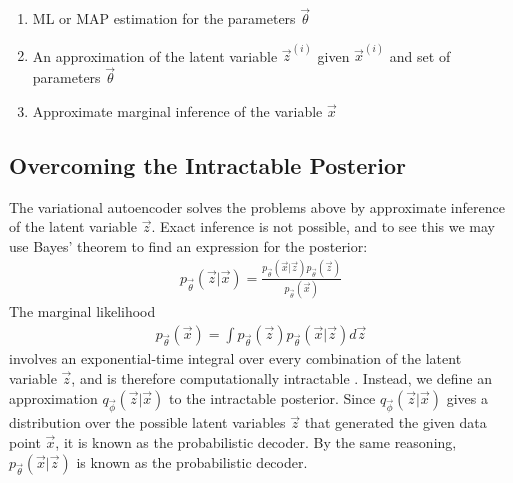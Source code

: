 \begin{enumerate}
\item ML or MAP estimation for the parameters $\vec{\theta}$
\item An approximation of the latent variable $\vec{z}^{(i)}$ given $\vec{x}^{(i)}$ and set of parameters $\vec{\theta}$
\item Approximate marginal inference of the variable $\vec{x}$
\end{enumerate}

\subsection{Overcoming the Intractable Posterior}
The variational autoencoder solves the problems above by approximate inference of the latent variable $\vec{z}$. Exact inference is not possible, and to see this we may use Bayes' theorem to find an expression for the posterior:
\begin{align}
p_{\vec{\theta}}(\vec{z}|\vec{x}) = \frac{p_{\vec{\theta}}(\vec{x}|\vec{z})p_{\vec{\theta}}(\vec{z})}{p_{\vec{\theta}}(\vec{x})}
\end{align}
The marginal likelihood
\begin{align}
p_{\vec{\theta}}(\vec{x}) = \int p_{\vec{\theta}}(\vec{z})p_{\vec{\theta}}(\vec{x}|\vec{z})d\vec{z}
\end{align}
involves an exponential-time integral over every combination of the latent variable $\vec{z}$, and is therefore computationally intractable \cite{Kingma2014}. Instead, we define an approximation $q_{\vec{\phi}}(\vec{z}|\vec{x})$ to the intractable posterior. Since $q_{\vec{\phi}}(\vec{z}|\vec{x})$ gives a distribution over the possible latent variables $\vec{z}$ that generated the given data point $\vec{x}$, it is known as the probabilistic decoder. By the same reasoning, $p_{\vec{\theta}}(\vec{x}|\vec{z})$ is known as the probabilistic decoder.

